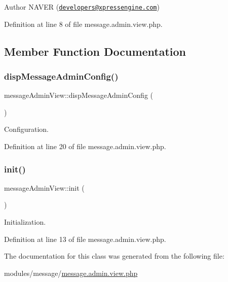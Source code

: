 \begin{DoxyAuthor}{Author}
N\+A\+V\+ER (\href{mailto:developers@xpressengine.com}{\tt developers@xpressengine.\+com}) 
\end{DoxyAuthor}


Definition at line 8 of file message.\+admin.\+view.\+php.



\subsection{Member Function Documentation}
\mbox{\label{classmessageAdminView_a20b39513c151ef7ed99f72a4b219533c}} 
\subsubsection{\texorpdfstring{disp\+Message\+Admin\+Config()}{dispMessageAdminConfig()}}
{\footnotesize\ttfamily message\+Admin\+View\+::disp\+Message\+Admin\+Config (\begin{DoxyParamCaption}{ }\end{DoxyParamCaption})}



Configuration. 



Definition at line 20 of file message.\+admin.\+view.\+php.

\mbox{\label{classmessageAdminView_acfd2740e92846bc6d2be0433a73fcf9c}} 
\subsubsection{\texorpdfstring{init()}{init()}}
{\footnotesize\ttfamily message\+Admin\+View\+::init (\begin{DoxyParamCaption}{ }\end{DoxyParamCaption})}



Initialization. 



Definition at line 13 of file message.\+admin.\+view.\+php.



The documentation for this class was generated from the following file\+:\begin{DoxyCompactItemize}
\item 
modules/message/\hyperlink{message_8admin_8view_8php}{message.\+admin.\+view.\+php}\end{DoxyCompactItemize}
